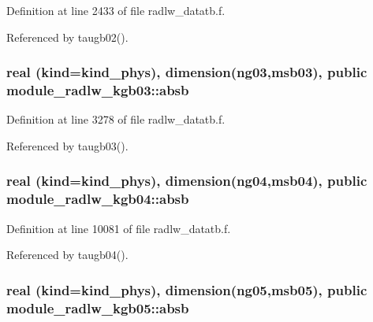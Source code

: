Definition at line 2433 of file radlw\+\_\+datatb.\+f.



Referenced by taugb02().

\subsubsection[{\texorpdfstring{absb}{absb}}]{\setlength{\rightskip}{0pt plus 5cm}real (kind=kind\+\_\+phys), dimension(ng03,msb03), public module\+\_\+radlw\+\_\+kgb03\+::absb}\hypertarget{group__module__radlw__main_gaa84ba66e0a3cc018b03bd13c9c21e133}{}\label{group__module__radlw__main_gaa84ba66e0a3cc018b03bd13c9c21e133}


Definition at line 3278 of file radlw\+\_\+datatb.\+f.



Referenced by taugb03().

\subsubsection[{\texorpdfstring{absb}{absb}}]{\setlength{\rightskip}{0pt plus 5cm}real (kind=kind\+\_\+phys), dimension(ng04,msb04), public module\+\_\+radlw\+\_\+kgb04\+::absb}\hypertarget{group__module__radlw__main_gaaacc55911b42c67396b5cdc4318e0d5f}{}\label{group__module__radlw__main_gaaacc55911b42c67396b5cdc4318e0d5f}


Definition at line 10081 of file radlw\+\_\+datatb.\+f.



Referenced by taugb04().

\subsubsection[{\texorpdfstring{absb}{absb}}]{\setlength{\rightskip}{0pt plus 5cm}real (kind=kind\+\_\+phys), dimension(ng05,msb05), public module\+\_\+radlw\+\_\+kgb05\+::absb}\hypertarget{group__module__radlw__main_gaebc667b0569824bba455e822eaea6112}{}\label{group__module__radlw__main_gaebc667b0569824bba455e822eaea6112}


